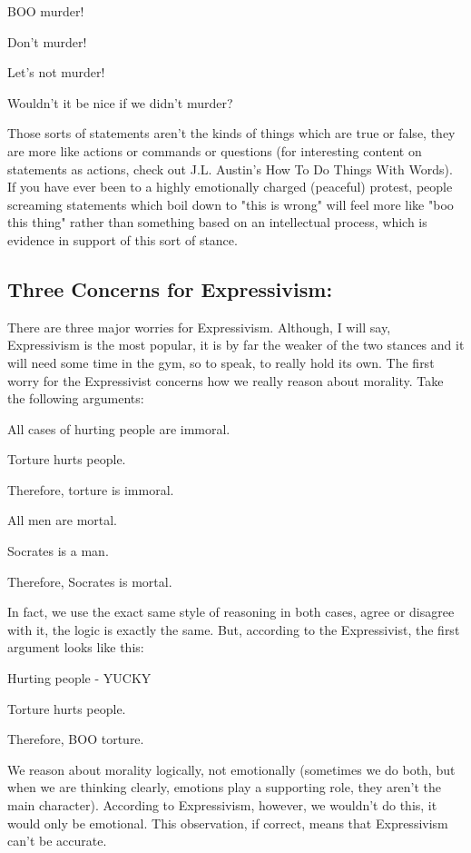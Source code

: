 \begin{earg}
    \item[]BOO murder!
    \item[]Don’t murder!
    \item[]Let’s not murder!
    \item[]Wouldn’t it be nice if we didn’t murder?
\end{earg}
Those sorts of statements aren’t the kinds of things which are true or false, they are more like actions or commands or questions (for interesting content on statements as actions, check out J.L. Austin's How To Do Things With Words). If you have ever been to a highly emotionally charged (peaceful) protest, people screaming statements which boil down to "this is wrong" will feel more like "boo this thing" rather than something based on an intellectual process, which is evidence in support of this sort of stance. 

\subsection{Three Concerns for Expressivism:}

There are three major worries for Expressivism. Although, I will say, Expressivism is the most popular, it is by far the weaker of the two stances and it will need some time in the gym, so to speak, to really hold its own. The first worry for the Expressivist concerns how we really reason about morality. Take the following arguments:

    \begin{earg}
    \item[]All cases of hurting people are immoral.
    \item[]Torture hurts people.
    \item[]Therefore, torture is immoral.
   \end{earg}

\begin{earg}
    \item[]All men are mortal.
    \item[]Socrates is a man.
    \item[]Therefore, Socrates is mortal.
\end{earg}

In fact, we use the exact same style of reasoning in both cases, agree or disagree with it, the logic is exactly the same. But, according to the Expressivist, the first argument looks like this:
\begin{earg}
    \item[]Hurting people - YUCKY
    \item[]Torture hurts people.
    \item[]Therefore, BOO torture. 
\end{earg}
We reason about morality logically, not emotionally (sometimes we do both, but when we are thinking clearly, emotions play a supporting role, they aren't the main character). According to Expressivism, however, we wouldn't do this, it would only be emotional. This observation, if correct, means that Expressivism can't be accurate. 


